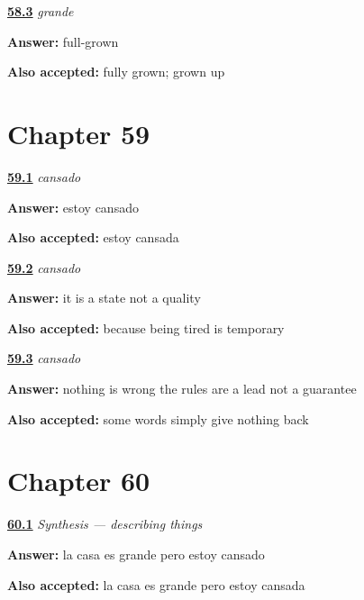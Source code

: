 \noindent\begin{minipage}[t]{\linewidth}
\raggedright
\hyperlink{review-ES-C09-grande-cousin}{\textbf{58.3}} \emph{grande}\par
\small \textbf{Answer:} full-grown\par
\footnotesize \textbf{Also accepted:} fully grown; grown up
\end{minipage}\par\medskip

\section*{Chapter 59}

\noindent\begin{minipage}[t]{\linewidth}
\raggedright
\hyperlink{review-ES-C09-cansado-say}{\textbf{59.1}} \emph{cansado}\par
\small \textbf{Answer:} estoy cansado\par
\footnotesize \textbf{Also accepted:} estoy cansada
\end{minipage}\par\medskip

\noindent\begin{minipage}[t]{\linewidth}
\raggedright
\hyperlink{review-ES-C09-cansado-which}{\textbf{59.2}} \emph{cansado}\par
\small \textbf{Answer:} it is a state not a quality\par
\footnotesize \textbf{Also accepted:} because being tired is temporary
\end{minipage}\par\medskip

\noindent\begin{minipage}[t]{\linewidth}
\raggedright
\hyperlink{review-ES-C09-cansado-nocousin}{\textbf{59.3}} \emph{cansado}\par
\small \textbf{Answer:} nothing is wrong the rules are a lead not a guarantee\par
\footnotesize \textbf{Also accepted:} some words simply give nothing back
\end{minipage}\par\medskip

\section*{Chapter 60}

\noindent\begin{minipage}[t]{\linewidth}
\raggedright
\hyperlink{review-ES-C09-sintesis-describir-both}{\textbf{60.1}} \emph{Synthesis — describing things}\par
\small \textbf{Answer:} la casa es grande pero estoy cansado\par
\footnotesize \textbf{Also accepted:} la casa es grande pero estoy cansada
\end{minipage}\par\medskip

